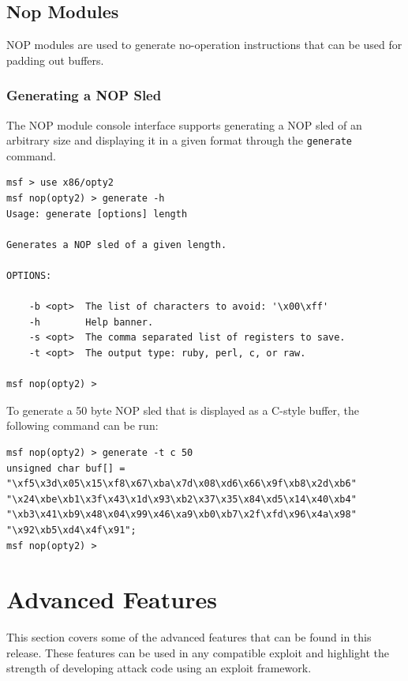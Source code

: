 \documentclass{report}
\begin{document}
	\section{Nop Modules}

\par
NOP modules are used to generate no-operation instructions that can be used for
padding out buffers.

		\subsection{Generating a NOP Sled}

\par
The NOP module console interface supports generating a NOP sled of an arbitrary
size and displaying it in a given format through the \texttt{generate} command.

\begin{verbatim}
msf > use x86/opty2
msf nop(opty2) > generate -h
Usage: generate [options] length

Generates a NOP sled of a given length.

OPTIONS:

    -b <opt>  The list of characters to avoid: '\x00\xff'
    -h        Help banner.
    -s <opt>  The comma separated list of registers to save.
    -t <opt>  The output type: ruby, perl, c, or raw.

msf nop(opty2) >
\end{verbatim}

\par
To generate a 50 byte NOP sled that is displayed as a C-style buffer, the
following command can be run:

\begin{verbatim}
msf nop(opty2) > generate -t c 50
unsigned char buf[] =
"\xf5\x3d\x05\x15\xf8\x67\xba\x7d\x08\xd6\x66\x9f\xb8\x2d\xb6"
"\x24\xbe\xb1\x3f\x43\x1d\x93\xb2\x37\x35\x84\xd5\x14\x40\xb4"
"\xb3\x41\xb9\x48\x04\x99\x46\xa9\xb0\xb7\x2f\xfd\x96\x4a\x98"
"\x92\xb5\xd4\x4f\x91";
msf nop(opty2) >
\end{verbatim}

\pagebreak

\chapter{Advanced Features}

\par
This section covers some of the advanced features that can be found in this
release. These features can be used in any compatible exploit and highlight the
strength of developing attack code using an exploit framework.
\end{document}
